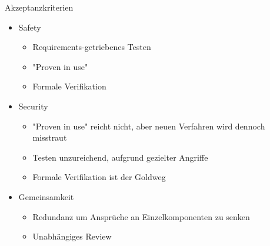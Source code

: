 %
\begin{frame}[T]{Akzeptanzkriterien}
  \begin{itemize}
    \item Safety
    \begin{itemize}
      \item Requirements-getriebenes Testen %
      \item "Proven in use" %
      \item Formale Verifikation %
    \end{itemize}

    \item Security
    \begin{itemize}
      \item "Proven in use" reicht nicht, aber neuen Verfahren wird dennoch misstraut
      \item Testen unzureichend, aufgrund gezielter Angriffe
      \item Formale Verifikation ist der Goldweg
    \end{itemize}

    \item Gemeinsamkeit
    \begin{itemize}
      \item Redundanz um Ansprüche an Einzelkomponenten zu senken
      \item Unabhängiges Review
    \end{itemize}
  \end{itemize}
\end{frame}
